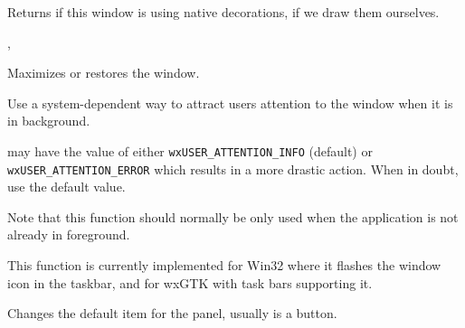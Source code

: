 

Returns \true if this window is using native decorations, \false if we draw
them ourselves.


,\\


\label{wxtoplevelwindowmaximize}


Maximizes or restores the window.






\label{wxtoplevelwindowrequestuserattention}


Use a system-dependent way to attract users attention to the window when it is
in background.

 may have the value of either \texttt{wxUSER\_ATTENTION\_INFO}
(default) or \texttt{wxUSER\_ATTENTION\_ERROR} which results in a more drastic
action. When in doubt, use the default value.

Note that this function should normally be only used when the application is
not already in foreground.

This function is currently implemented for Win32 where it flashes the
window icon in the taskbar, and for wxGTK with task bars supporting it.


\label{wxtoplevelwindowsetdefaultitem}


Changes the default item for the panel, usually  is a button.


